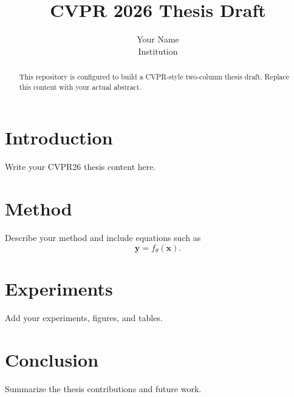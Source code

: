 \documentclass[10pt,twocolumn,letterpaper]{article}
\title{CVPR 2026 Thesis Draft}
\author{Your Name\\Institution}
\date{}
\begin{document}
\maketitle

\begin{abstract}
This repository is configured to build a CVPR-style two-column thesis draft.
Replace this content with your actual abstract.
\end{abstract}

\section{Introduction}
Write your CVPR26 thesis content here.

\section{Method}
Describe your method and include equations such as
\begin{equation}
\mathbf{y} = f_{\theta}(\mathbf{x}).
\end{equation}

\section{Experiments}
Add your experiments, figures, and tables.

\section{Conclusion}
Summarize the thesis contributions and future work.
\end{document}
